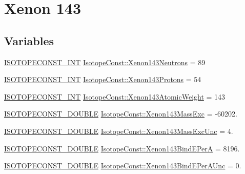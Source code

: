 \hypertarget{group___isotope_const-_xenon-_xe143}{}\section{Xenon 143}
\label{group___isotope_const-_xenon-_xe143}
\subsection*{Variables}
\begin{DoxyCompactItemize}
\item 
\mbox{\hyperlink{group___isotope_const-_macros_ga5f18360b3e99483a35c32d789e62621c}{I\+S\+O\+T\+O\+P\+E\+C\+O\+N\+S\+T\+\_\+\+I\+NT}} \mbox{\hyperlink{group___isotope_const-_xenon-_xe143_gae2c3fc3791abc6c897ef66b4c83d4c23}{Isotope\+Const\+::\+Xenon143\+Neutrons}} = 89
\item 
\mbox{\hyperlink{group___isotope_const-_macros_ga5f18360b3e99483a35c32d789e62621c}{I\+S\+O\+T\+O\+P\+E\+C\+O\+N\+S\+T\+\_\+\+I\+NT}} \mbox{\hyperlink{group___isotope_const-_xenon-_xe143_ga33759bfe517d7d82c5cb967e6dfae2e8}{Isotope\+Const\+::\+Xenon143\+Protons}} = 54
\item 
\mbox{\hyperlink{group___isotope_const-_macros_ga5f18360b3e99483a35c32d789e62621c}{I\+S\+O\+T\+O\+P\+E\+C\+O\+N\+S\+T\+\_\+\+I\+NT}} \mbox{\hyperlink{group___isotope_const-_xenon-_xe143_ga3d070e390a16d69375558df81c9f8acb}{Isotope\+Const\+::\+Xenon143\+Atomic\+Weight}} = 143
\item 
\mbox{\hyperlink{group___isotope_const-_macros_ga8f45a7272ce02c0b4c65c44636ed719a}{I\+S\+O\+T\+O\+P\+E\+C\+O\+N\+S\+T\+\_\+\+D\+O\+U\+B\+LE}} \mbox{\hyperlink{group___isotope_const-_xenon-_xe143_gad63147130e20cbb4dd5285f4db313009}{Isotope\+Const\+::\+Xenon143\+Mass\+Exc}} = -\/60202.
\item 
\mbox{\hyperlink{group___isotope_const-_macros_ga8f45a7272ce02c0b4c65c44636ed719a}{I\+S\+O\+T\+O\+P\+E\+C\+O\+N\+S\+T\+\_\+\+D\+O\+U\+B\+LE}} \mbox{\hyperlink{group___isotope_const-_xenon-_xe143_ga7ad621b4f6e7bb8a548fae2376daaaaf}{Isotope\+Const\+::\+Xenon143\+Mass\+Exc\+Unc}} = 4.
\item 
\mbox{\hyperlink{group___isotope_const-_macros_ga8f45a7272ce02c0b4c65c44636ed719a}{I\+S\+O\+T\+O\+P\+E\+C\+O\+N\+S\+T\+\_\+\+D\+O\+U\+B\+LE}} \mbox{\hyperlink{group___isotope_const-_xenon-_xe143_ga9e21c8736ce95a69e048f9ec97c69e62}{Isotope\+Const\+::\+Xenon143\+Bind\+E\+PerA}} = 8196.
\item 
\mbox{\hyperlink{group___isotope_const-_macros_ga8f45a7272ce02c0b4c65c44636ed719a}{I\+S\+O\+T\+O\+P\+E\+C\+O\+N\+S\+T\+\_\+\+D\+O\+U\+B\+LE}} \mbox{\hyperlink{group___isotope_const-_xenon-_xe143_gaa3d591b5750cb1431c42a4f632561448}{Isotope\+Const\+::\+Xenon143\+Bind\+E\+Per\+A\+Unc}} = 0.

\end{DoxyCompactItemize}
